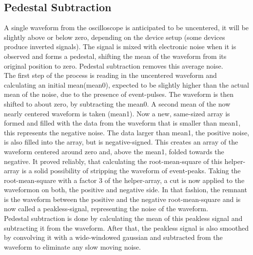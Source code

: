 \documentclass[12pt,article,type=msc,colorback,accentcolor=tud9c]{tudthesis}
\begin{document}
\subsection{Pedestal Subtraction}
\begin{wrapfigure}{R}{0.5\textwidth}
\centering
\texttt{[image: D:/OwnCloudData/00\_WriteUp/04\_Thesis/Pic/Analysis/\{HAM\_T22.0\_Vb68.5.trcFiltered1Zoom]}.pdf}
\caption{\label{fig:PedSub}Pedestal subtraction++}
\end{wrapfigure}
A single waveform from the oscilloscope is anticipated to be uncentered, it will be slightly above or below zero, depending on the device setup (some devices produce inverted signals). The signal is mixed with electronic noise when it is observed and forms a pedestal, shifting the mean of the waveform from its original position to zero. Pedestal subtraction removes this average noise.\\
The first step of the process is reading in the uncentered waveform and calculating an initial mean(mean0), expected to be slightly higher than the actual mean of the noise, due to the presence of event-pulses. The waveform is then shifted to about zero, by subtracting the mean0. A second mean of the now nearly centered waveform is taken (mean1). Now a new, same-sized array is formed and filled with the data from the waveform that is smaller than mean1, this represents the negative noise. The data larger than mean1, the positive noise, is also filled into the array, but is negative-signed. This creates an array of the waveform centered around zero and, above the mean1, folded towards the negative. It proved reliably, that calculating the root-mean-square of this helper-array is a solid possibility of stripping the waveform of event-peaks. Taking the root-mean-square with a factor 3 of the helper-array, a cut is now applied to the waveformon on both, the positive and negative side. In that fashion, the remnant is the waveform between the positive and the negative root-mean-square and is now called a peakless-signal, representing the noise of the waveform.\\
Pedestal subtraction is done by calculating the mean of this peakless signal and subtracting it from the waveform. After that, the peakless signal is also smoothed by convolving it with a wide-windowed gaussian and subtracted from the waveform to eliminate any slow moving noise.


\clearpage
\end{document}
